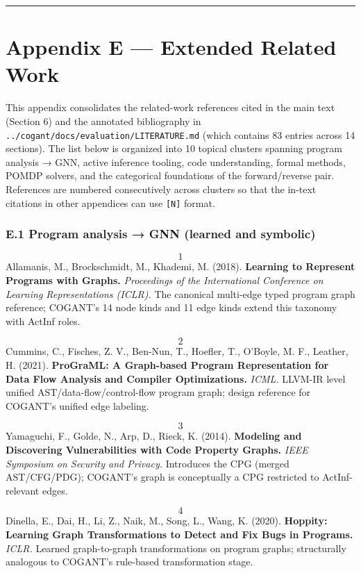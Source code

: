 \documentclass[
]{article}
\begin{document}
\begin{center}\rule{0.5\linewidth}{0.5pt}\end{center}

\newpage

\section{Appendix E --- Extended Related
Work}\label{appendix-e-extended-related-work}

This appendix consolidates the related-work references cited in the main
text (Section 6) and the annotated bibliography in
\texttt{../cogant/docs/evaluation/LITERATURE.md} (which contains 83
entries across 14 sections). The list below is organized into 10 topical
clusters spanning program analysis → GNN, active inference tooling, code
understanding, formal methods, POMDP solvers, and the categorical
foundations of the forward/reverse pair. References are numbered
consecutively across clusters so that the in-text citations in other
appendices can use \texttt{{[}N{]}} format.

\subsubsection{E.1 Program analysis → GNN (learned and
symbolic)}\label{e.1-program-analysis-gnn-learned-and-symbolic}

\[1\] Allamanis, M., Brockschmidt, M., Khademi, M. (2018).
\textbf{Learning to Represent Programs with Graphs.} \emph{Proceedings
of the International Conference on Learning Representations (ICLR).} The
canonical multi-edge typed program graph reference; COGANT's 14 node
kinds and 11 edge kinds extend this taxonomy with ActInf roles.

\[2\] Cummins, C., Fisches, Z. V., Ben-Nun, T., Hoefler, T., O'Boyle,
M. F., Leather, H. (2021). \textbf{ProGraML: A Graph-based Program
Representation for Data Flow Analysis and Compiler Optimizations.}
\emph{ICML.} LLVM-IR level unified AST/data-flow/control-flow program
graph; design reference for COGANT's unified edge labeling.

\[3\] Yamaguchi, F., Golde, N., Arp, D., Rieck, K. (2014).
\textbf{Modeling and Discovering Vulnerabilities with Code Property
Graphs.} \emph{IEEE Symposium on Security and Privacy.} Introduces the
CPG (merged AST/CFG/PDG); COGANT's graph is conceptually a CPG
restricted to ActInf-relevant edges.

\[4\] Dinella, E., Dai, H., Li, Z., Naik, M., Song, L., Wang, K.
(2020). \textbf{Hoppity: Learning Graph Transformations to Detect and
Fix Bugs in Programs.} \emph{ICLR.} Learned graph-to-graph
transformations on program graphs; structurally analogous to COGANT's
rule-based transformation stage.
\end{document}
